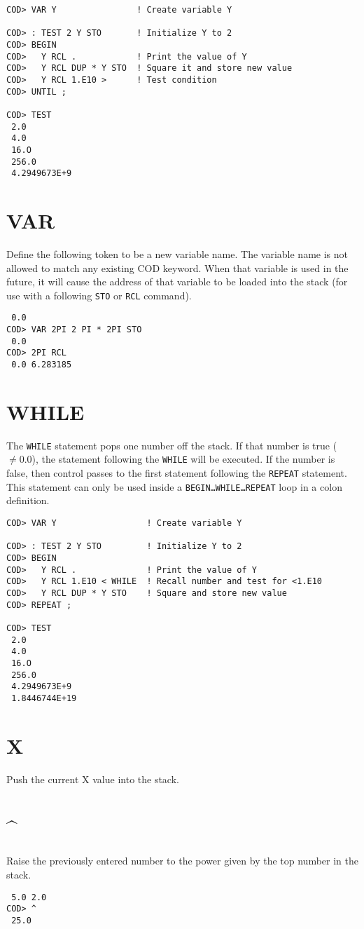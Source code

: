 \medskip
{}
\begin{verbatim}
COD> VAR Y                ! Create variable Y

COD> : TEST 2 Y STO       ! Initialize Y to 2
COD> BEGIN
COD>   Y RCL .            ! Print the value of Y
COD>   Y RCL DUP * Y STO  ! Square it and store new value
COD>   Y RCL 1.E10 >      ! Test condition
COD> UNTIL ;

COD> TEST
 2.0
 4.0
 16.O
 256.0
 4.2949673E+9
\end{verbatim}

\section*{VAR}
Define the following token to be a new variable name.
The variable name is not allowed to match any existing COD keyword.
When that variable is used in the future,
it will cause the address of that variable to be loaded into the stack
(for use with a following {\tt STO} or {\tt RCL} command).

\medskip
{}
\begin{verbatim}
 0.0
COD> VAR 2PI 2 PI * 2PI STO
 0.0
COD> 2PI RCL
 0.0 6.283185
\end{verbatim}

\section*{WHILE}
The {\tt WHILE} statement pops one number off the stack.
If that number is true ($\neq 0.0$),
the statement following the {\tt WHILE} will be executed.
If the number is false,
then control passes to the first statement
following the {\tt REPEAT} statement.
This statement can only be used
inside a {\tt BEGIN\ldots WHILE\ldots REPEAT} loop
in a colon definition.

\medskip
{}
\begin{verbatim}
COD> VAR Y                  ! Create variable Y

COD> : TEST 2 Y STO         ! Initialize Y to 2
COD> BEGIN
COD>   Y RCL .              ! Print the value of Y
COD>   Y RCL 1.E10 < WHILE  ! Recall number and test for <1.E10
COD>   Y RCL DUP * Y STO    ! Square and store new value
COD> REPEAT ;

COD> TEST
 2.0
 4.0
 16.O
 256.0
 4.2949673E+9
 1.8446744E+19
\end{verbatim}

\section*{X}
Push the current X value into the stack.

\section*{\Huge \^{}}
Raise the previously entered number
to the power given by the top number in the stack.

\medskip
{}
\begin{verbatim}
 5.0 2.0
COD> ^
 25.0
\end{verbatim}
